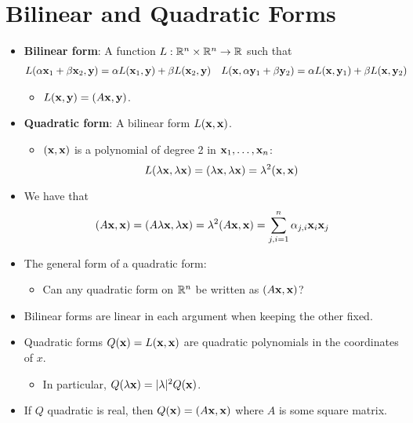 \documentclass[../../notes.tex]{subfiles}
\begin{document}
\chapter{Bilinear and Quadratic Forms}
\begin{itemize}
    \item {}\textbf{Bilinear form}: A function $L:\mathbb{R}^n\times\mathbb{R}^n\to\mathbb{R}$ such that
    \begin{align*}
        L(\alpha\mathbf{x}_1+\beta\mathbf{x}_2,\mathbf{y}) &= \alpha L(\mathbf{x}_1,\mathbf{y})+\beta L(\mathbf{x}_2,\mathbf{y})&
        L(\mathbf{x},\alpha\mathbf{y}_1+\beta\mathbf{y}_2) &= \alpha L(\mathbf{x},\mathbf{y}_1)+\beta L(\mathbf{x},\mathbf{y}_2)
    \end{align*}
    \begin{itemize}
        \item $L(\mathbf{x},\mathbf{y})=(A\mathbf{x},\mathbf{y})$.
    \end{itemize}
    \item \textbf{Quadratic form}: A bilinear form $L(\mathbf{x},\mathbf{x})$.
    \begin{itemize}
        \item $(\mathbf{x},\mathbf{x})$ is a polynomial of degree 2 in $\mathbf{x}_1,\dots,\mathbf{x}_n$:
        \begin{equation*}
            L(\lambda\mathbf{x},\lambda\mathbf{x}) = (\lambda\mathbf{x},\lambda\mathbf{x}) = \lambda^2(\mathbf{x},\mathbf{x})
        \end{equation*}
    \end{itemize}
    \item We have that
    \begin{equation*}
        (A\mathbf{x},\mathbf{x}) = (A\lambda\mathbf{x},\lambda\mathbf{x}) = \lambda^2(A\mathbf{x},\mathbf{x}) = \sum_{j,i=1}^n\alpha_{j,i}\mathbf{x}_i\mathbf{x}_j
    \end{equation*}
    \item The general form of a quadratic form:
    \begin{itemize}
        \item Can any quadratic form on $\mathbb{R}^n$ be written as $(A\mathbf{x},\mathbf{x})$?
    \end{itemize}
    \item {}Bilinear forms are linear in each argument when keeping the other fixed.
    \item Quadratic forms $Q(\mathbf{x})=L(\mathbf{x},\mathbf{x})$ are quadratic polynomials in the coordinates of $x$.
    \begin{itemize}
        \item In particular, $Q(\lambda\mathbf{x})=|\lambda|^2Q(\mathbf{x})$.
    \end{itemize}
    \item If $Q$ quadratic is real, then $Q(\mathbf{x})=(A\mathbf{x},\mathbf{x})$ where $A$ is some square matrix.

\end{itemize}
\end{document}
